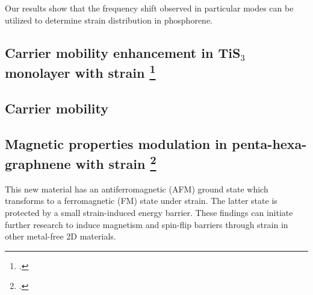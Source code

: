 Our results show that the frequency shift observed in particular modes can be utilized to determine strain distribution in phosphorene.

\subsection[Carrier mobility enhancement in TiS$_3$ monolayer with strain]{Carrier mobility enhancement in TiS$_3$ monolayer with strain \footcite[This work is published in:][]{Aierken2016.mobility}}

%

\subsection{Carrier mobility}

\subsection[Magnetic properties modulation in penta-hexa-graphnene with strain]{Magnetic properties modulation in penta-hexa-graphnene with strain \footcite[This work is published in:][]{Aierken2016.magnetism}}

This new material has an antiferromagnetic (AFM) ground state which transforms to a ferromagnetic (FM) state under strain. The latter state is protected by a small strain-induced energy barrier. These findings can initiate further research to induce magnetism and spin-flip barriers through strain in other metal-free 2D materials.

